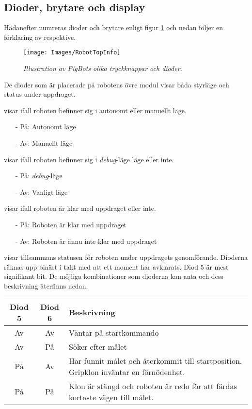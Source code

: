 \documentclass[11pt]{article}
\begin{document}
\subsection{Dioder, brytare och display}
Hädanefter numreras dioder och brytare enligt figur \ref{picTop} och nedan följer en förklaring av respektive.

\begin{figure}[htbp]
	\centering
	\texttt{[image: Images/RobotTopInfo]}
	\caption{\textit{Illustration av PigBots olika tryckknappar och dioder.} \label{picTop}}
\end{figure}

De dioder som är placerade på robotens övre modul visar båda styrläge och status under uppdraget.
\begin{description}[style=unboxed, leftmargin=0cm]
  \item[Diod 1] visar ifall roboten befinner sig i autonomt eller manuellt läge. 
    \begin{itemize}
      \setlength\itemsep{-0.5em}
      \item[-] På: Autonomt läge 
      \item[-] Av: Manuellt läge
    \end{itemize}
  \item[Diod 2] visar ifall roboten befinner sig i \textit{debug}-läge läge eller inte.
    \begin{itemize}
      \setlength\itemsep{-0.5em}
      \item[-] På: \textit{debug}-läge
      \item[-] Av: Vanligt läge
    \end{itemize}
  \item[Diod 3] visar ifall roboten är klar med uppdraget eller inte.
    \begin{itemize}
      \setlength\itemsep{-0.5em}
      \item[-] På: Roboten är klar med uppdraget
      \item[-] Av: Roboten är ännu inte klar med uppdraget
    \end{itemize}
  \item[Diod 4 och 5] visar tillsammans statusen för roboten under uppdragets genomförande. Dioderna räknas upp binärt i takt med att ett moment har avklarats. Diod 5 är mest signifikant bit. De möjliga kombinationer som dioderna kan anta och dess beskrivning återfinns nedan.

    \hspace{2em}\begin{tabular}{c c p{8cm}}
	Diod 5 & Diod 6 & Beskrivning \\ \hline
	Av & Av & Väntar på startkommando \\
	Av & På & Söker efter målet \\
	På & Av & Har funnit målet och återkommit till startposition. Gripklon inväntar en förnödenhet. \\
	På & På & Klon är stängd och roboten är redo för att färdas kortaste vägen till målet.

    \end{tabular}
\end{description}
\end{document}
